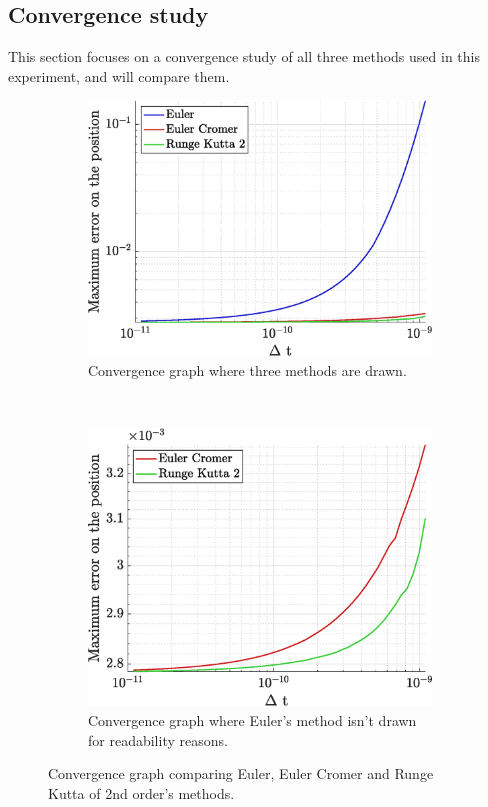 \documentclass[a4paper,12pt,twoside]{article}
\begin{document}
\subsection{Convergence study}
This section focuses on a convergence study of all three methods used in this experiment, and will compare them.
\begin{figure}[h]
\centering
\begin{subfigure}[t]{0.45\textwidth}
	\includegraphics[width=\textwidth]{graphs/app1_conv_ALL.eps}
	\caption{Convergence graph where three methods are drawn.}
	\label{fig:app1-conv-ALL}
\end{subfigure}
~
\begin{subfigure}[t]{0.45\textwidth}
	\includegraphics[width=\textwidth]{graphs/app1_conv_noEuler.eps}
	\caption{Convergence graph where Euler's method isn't drawn for readability reasons.}
	\label{fig:app1-conv-noEuler}
\end{subfigure}
\caption{Convergence graph comparing Euler, Euler Cromer and Runge Kutta of 2nd order's methods.}
\label{fig:app1-conv}
\end{figure}
\end{document}
